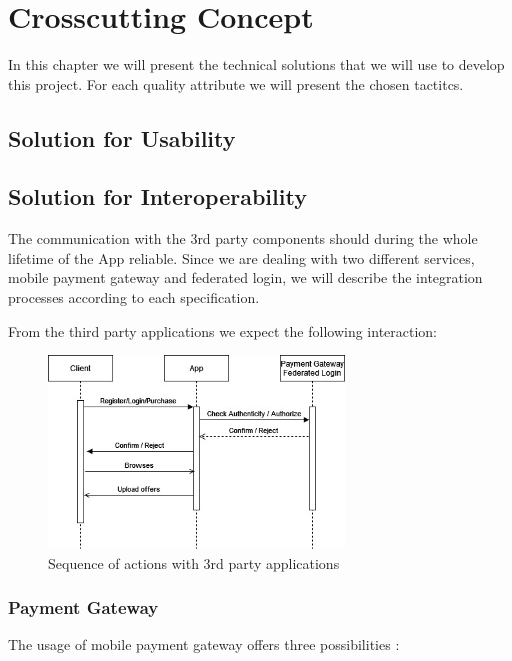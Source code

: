 \section{Crosscutting Concept}

In this chapter we will present the technical solutions that we will use to develop this project.
For each quality attribute we will present the chosen tactitcs.

\subsection{Solution for Usability}

\subsection{Solution for Interoperability}

The communication with the 3rd party components should during the whole lifetime of the App reliable. Since we are dealing with
two different services, \gls{mobile payment gateway} and \gls{federated login}, we will describe the integration processes 
according to each specification.

From the third party applications we expect the following interaction:

\begin{figure}[H]
    \centering
    \includegraphics[width=0.7\textwidth]{assets/sequence_login_payment.jpg}
    \caption{Sequence of actions with 3rd party applications}
    \label{fig:sequence_login_payment}
\end{figure}

\subsubsection{Payment Gateway}

The usage of \gls{mobile payment gateway} offers three possibilities \cite{refonline:ZOPG}:

